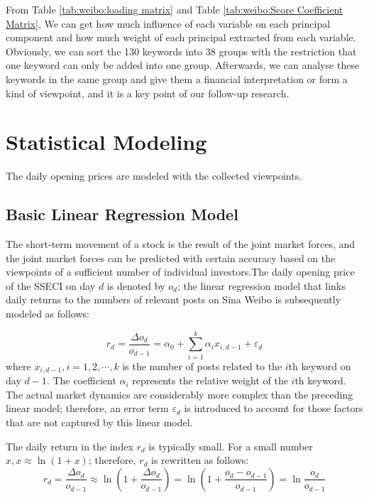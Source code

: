 \documentclass[review,3p,times,12pt,number]{elsarticle}
\begin{document}
From Table \ref{tab:weibo:loading matrix} and Table \ref{tab:weibo:Score Coefficient Matrix}, We can get how much influence of each variable on each principal component and how much weight of each principal extracted from each variable.
Obviously, we can sort the 130 keywords into 38 groups with the restriction that one keyword can only be added into one group.
Afterwards, we can analyse these keywords in the same group and give them a financial interpretation or form a kind of viewpoint, and it is a key point of our follow-up research.



\section{Statistical Modeling}
\label{sec:weibo:model}

The daily opening prices are modeled with the collected viewpoints.

\subsection{Basic Linear Regression Model}
The short-term movement of a stock is the result of the joint market forces, and the joint market forces can be predicted with certain accuracy based on the viewpoints of a sufficient number of individual investors.The daily opening price of the SSECI on day $d$ is denoted by $o_d$; the linear regression model that links daily returns to the numbers of relevant posts on Sina Weibo is subsequently modeled as follows:

\begin{equation}
	r_d=\frac{ \Delta o_d }{o_{d-1}} = \alpha_0 + \sum_{i=1}^{k} \alpha_i x_{i,d-1} + \varepsilon_d \label{weibo:eqn:predict}
\end{equation}
where $x_{i,d-1}, i=1,2,\cdots, k$ is the number of posts related to the $i$th keyword on day $d-1$. The coefficient $\alpha_i$ represents the relative weight of the $i$th keyword. The actual market dynamics are considerably more complex than the preceding linear model; therefore, an error term $\varepsilon_d$ is introduced to account for those factors that are not captured by this linear model.

The daily return in the index $r_d$ is typically small. For a small number $x, x \approx \ln (1+x)$; therefore, $r_d$ is rewritten as follows:
\[
	r_d=\frac{ \Delta o_d }{o_{d-1}} \approx \ln (1 + \frac{ \Delta o_d }{o_{d-1}}) = \ln (1 + \frac{o_d - o_{d-1}}{o_{d-1}}) = \ln \frac{o_d}{o_{d-1}}
\]
\end{document}
